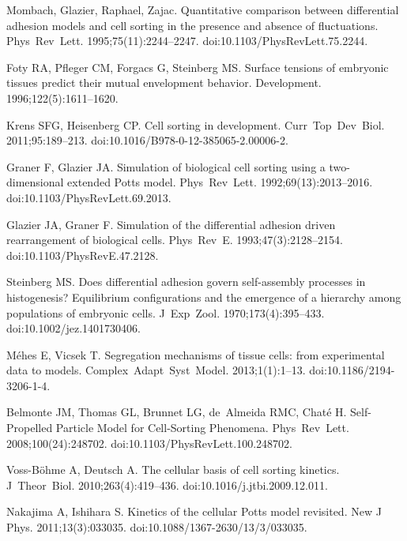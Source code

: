 \documentclass[10pt,letterpaper]{article}
\begin{document}
\begin{thebibliography}{10}
Mombach, Glazier, Raphael, Zajac.
\newblock Quantitative comparison between differential adhesion models and cell
  sorting in the presence and absence of fluctuations.
\newblock Phys~Rev~Lett. 1995;75(11):2244--2247.
\newblock doi:{10.1103/PhysRevLett.75.2244}.

Foty RA, Pfleger CM, Forgacs G, Steinberg MS.
\newblock Surface tensions of embryonic tissues predict their mutual
  envelopment behavior.
\newblock Development. 1996;122(5):1611--1620.

Krens SFG, Heisenberg CP.
\newblock Cell sorting in development.
\newblock Curr~Top~Dev~Biol. 2011;95:189--213.
\newblock doi:{10.1016/B978-0-12-385065-2.00006-2}.

Graner F, Glazier JA.
\newblock Simulation of biological cell sorting using a two-dimensional
  extended Potts model.
\newblock Phys~Rev~Lett. 1992;69(13):2013--2016.
\newblock doi:{10.1103/PhysRevLett.69.2013}.

Glazier JA, Graner F.
\newblock Simulation of the differential adhesion driven rearrangement of
  biological cells.
\newblock Phys~Rev~E. 1993;47(3):2128--2154.
\newblock doi:{10.1103/PhysRevE.47.2128}.

Steinberg MS.
\newblock Does differential adhesion govern self-assembly processes in
  histogenesis? Equilibrium configurations and the emergence of a hierarchy
  among populations of embryonic cells.
\newblock J~Exp~Zool. 1970;173(4):395--433.
\newblock doi:{10.1002/jez.1401730406}.

M\'{e}hes E, Vicsek T.
\newblock Segregation mechanisms of tissue cells: from experimental data to
  models.
\newblock Complex~Adapt~Syst~Model. 2013;1(1):1--13.
\newblock doi:{10.1186/2194-3206-1-4}.

Belmonte JM, Thomas GL, Brunnet LG, de~Almeida RMC, Chat\'{e} H.
\newblock Self-Propelled Particle Model for Cell-Sorting Phenomena.
\newblock Phys~Rev~Lett. 2008;100(24):248702.
\newblock doi:{10.1103/PhysRevLett.100.248702}.

Voss-B\"ohme A, Deutsch A.
\newblock The cellular basis of cell sorting kinetics.
\newblock J~Theor~Biol. 2010;263(4):419--436.
\newblock doi:{10.1016/j.jtbi.2009.12.011}.

Nakajima A, Ishihara S.
\newblock Kinetics of the cellular Potts model revisited.
\newblock New J Phys. 2011;13(3):033035.
\newblock doi:{10.1088/1367-2630/13/3/033035}.


\end{thebibliography}
\end{document}
